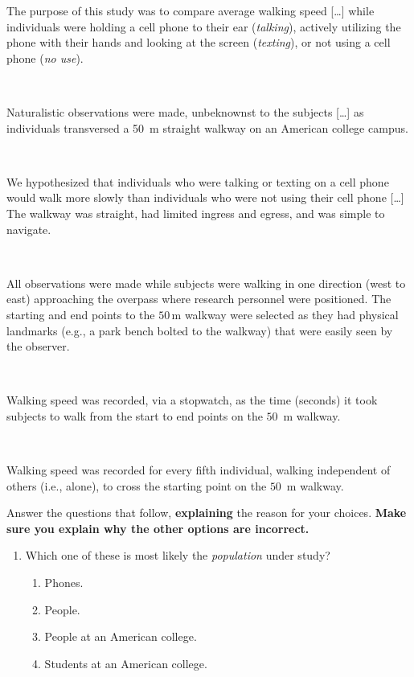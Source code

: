 \documentclass[
  11pt,
  a4paper,
  krantz2]{krantz}
\makeatletter
\providecommand{\tightlist}{%
  \setlength{\itemsep}{0pt}\setlength{\parskip}{0pt}}
\renewenvironment{quote}%
{\begin{kframe}}
{\end{kframe}}
\newenvironment{kframe}{%
\medskip{}
\setlength{\fboxsep}{.8em}
 \def\at@end@of@kframe{}%
 \ifinner\ifhmode%
  \def\at@end@of@kframe{\end{minipage}}%
  \begin{minipage}{\columnwidth}%
 \fi\fi%
 \def\FrameCommand##1{\hskip\@totalleftmargin \hskip-\fboxsep
 \colorbox{shadecolor}{##1}\hskip-\fboxsep
     \hskip-\linewidth \hskip-\@totalleftmargin \hskip\columnwidth}%
 \MakeFramed {\advance\hsize-\width
   \@totalleftmargin\z@ \linewidth\hsize
   \@setminipage}}%
 {\par\unskip\endMakeFramed%
 \at@end@of@kframe}
\renewenvironment{quote}
               {\list{}{\vspace{-0.5em}\begin{kframe}\small%
                        \rightmargin   \leftmargin
                        \parsep        \z@ \@plus\p@}%
                \item\relax}
               {\end{kframe}\endlist}
\makeatother
\begin{document}
\begin{quote}
The purpose of this study was to compare average walking speed {[}\ldots{]} while individuals were holding a cell phone to their ear (\emph{talking}), actively utilizing the phone with their hands and looking at the screen (\emph{texting}), or not using a cell phone (\emph{no use}).\\
\strut ~

Naturalistic observations were made, unbeknownst to the subjects {[}\ldots{]} as individuals transversed a 50~m straight walkway on an American college campus.\\
\strut ~

We hypothesized that individuals who were talking or texting on a cell phone would walk more slowly than individuals who were not using their cell phone {[}\ldots{]}
The walkway was straight, had limited ingress and egress, and was simple to navigate.\\
\strut ~

All observations were made while subjects were walking in one direction (west to east) approaching the overpass where research personnel were positioned.
The starting and end points to the \(50\,\text{m}\) walkway were selected as they had physical landmarks (e.g., a park bench bolted to the walkway) that were easily seen by the observer.\\
\strut ~

Walking speed was recorded, via a stopwatch, as the time (seconds) it took subjects to walk from the start to end points on the \(50\)~m walkway.\\
\strut ~

Walking speed was recorded for every fifth individual, walking independent of others (i.e., alone), to cross the starting point on the \(50\)~m walkway.
\end{quote}

Answer the questions that follow, \textbf{explaining} the reason for your choices.
\textbf{Make sure you explain why the other options are incorrect.}

\begin{enumerate}
\def\labelenumi{\arabic{enumi}.}
\tightlist
\item
  Which one of these is most likely the \emph{population} under study?

  \begin{enumerate}
  \def\labelenumii{\alph{enumii}.}
  \tightlist
  \item
    Phones.
  \item
    People.
  \item
    People at an American college.
  \item
    Students at an American college.
  \end{enumerate}
\end{enumerate}
\end{document}

